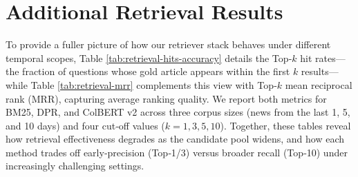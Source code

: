 \documentclass[11pt]{article}
\begin{document}
\clearpage
\section{Additional Retrieval Results}
\label{app:retrieval-tables}

To provide a fuller picture of how our retriever stack behaves under different temporal scopes, Table \ref{tab:retrieval-hits-accuracy} details the Top‑$k$ hit rates—the fraction of questions whose gold article appears within the first $k$ results—while Table \ref{tab:retrieval-mrr} complements this view with Top‑$k$ mean reciprocal rank (MRR), capturing average ranking quality.  We report both metrics for BM25, DPR, and ColBERT v2 across three corpus sizes (news from the last 1, 5, and 10 days) and four cut‑off values ($k = 1,3,5,10$).  Together, these tables reveal how retrieval effectiveness degrades as the candidate pool widens, and how each method trades off early‑precision (Top‑1/3) versus broader recall (Top‑10) under increasingly challenging settings.


\begin{table*}[!ht]
\centering
\caption{Top-$k$ hits accuracy (\%) for different retrieval methods across 1-day, 5-day, and 10-day corpora. Each cell represents the fraction of questions for which the ground-truth article is ranked within the top $k$ results.}
\label{tab:retrieval-hits-accuracy}
\end{table*}
\end{document}
